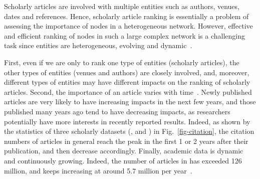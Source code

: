 



Scholarly articles are involved with multiple entities such as authors, venues, dates and references. Hence, scholarly article ranking is essentially a problem of assessing the importance of nodes in a heterogeneous network.
However, effective and efficient ranking of nodes in such a large complex network is a challenging task since entities
are heterogeneous, evolving and dynamic~\cite{AggarwalS14-survey,fcs-biggraph}.



First, even if we are only to rank one type of entities (\eg scholarly articles), the other types of entities (\eg venues and authors) are closely involved, and, moreover, different types of entities may have different impacts on the ranking of scholarly articles.
%
%
Second, the importance of an article varies with time~\cite{WangSB13}. Newly published articles are very likely to have increasing impacts in the next few years, and those published many years ago tend to have decreasing impacts, as researchers potentially have more interests in recently reported results. Indeed, as shown by the statistics of three scholarly datasets (\aan, \aminer and \magdata) in Fig.~\ref{fig-citation}, the citation numbers of articles in general reach the peak in the first 1 or 2 years after their publication, and then decrease accordingly. %
%
Finally, academic data is dynamic and continuously growing. Indeed, the number of articles in \magdata has exceeded 126 million, and keeps increasing at around 5.7 million per year~\cite{Sinha15:MAG}.



